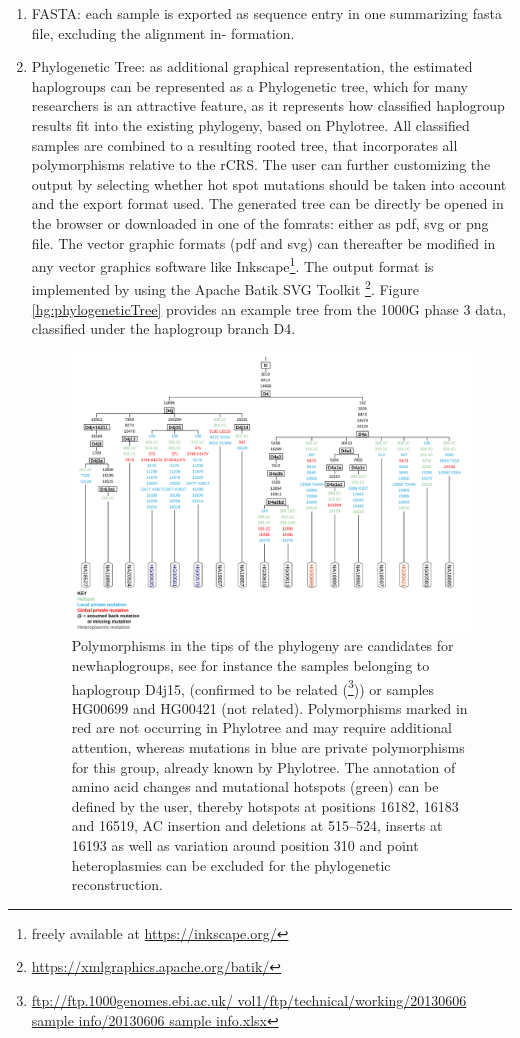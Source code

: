\begin{enumerate}
\item  FASTA: each sample is exported as sequence entry in one summarizing fasta file, excluding the alignment in- formation.
\item Phylogenetic Tree: as additional graphical representation, the estimated haplogroups can be represented as a Phylogenetic tree, which for many researchers is an attractive feature, as it represents how classified haplogroup results fit into the existing phylogeny, based on Phylotree. All classified samples are combined to a resulting rooted tree, that incorporates all polymorphisms relative to the rCRS. The user can further customizing the output by selecting whether hot spot mutations should be taken into account and the export format used. The generated tree can be directly be opened in the browser or downloaded in one of the fomrats: either as pdf, svg or png file. The vector graphic formats (pdf and svg) can thereafter be modified in any vector graphics software like Inkscape\footnote{freely available at \url{https://inkscape.org/}}. The output format is implemented by using the Apache Batik SVG Toolkit \footnote{\url{https://xmlgraphics.apache.org/batik/}}. Figure \ref{hg:phylogeneticTree} provides an example tree from the 1000G phase 3 data, classified under the haplogroup branch D4.
\begin{figure}[!ht]
    \centering
    \includegraphics[width=1\textwidth]{images/tree.png}
    \caption[Export of Graphical Phylogenetic Tree]{Polymorphisms in the tips of the phylogeny are candidates for newhaplogroups, see for instance the samples belonging to haplogroup D4j15, (confirmed to be related (\footnote{\url{ftp://ftp.1000genomes.ebi.ac.uk/ vol1/ftp/technical/working/20130606 sample info/20130606 sample info.xlsx}})) or samples HG00699 and HG00421 (not related). Polymorphisms marked in red are not occurring in Phylotree and may require additional attention, whereas mutations in blue are private polymorphisms for this group, already known by Phylotree. The annotation of amino acid changes and mutational hotspots (green) can be defined by the user, thereby hotspots at positions 16182, 16183 and 16519, AC insertion and deletions at 515–524, inserts at 16193 as well as variation around position 310 and point heteroplasmies can be excluded for the phylogenetic reconstruction. } 

\end{figure}
\end{enumerate}
